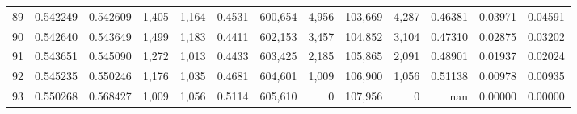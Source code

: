 \begin{tabular}{rrrrrrrrrrrrr}
89 &  0.542249 &  0.542609 &   1,405 &  1,164 &                                     0.4531 &  600,654 &    4,956 &  103,669 &    4,287 &  0.46381 &  0.03971 &  0.04591 \\
90 &  0.542640 &  0.543649 &   1,499 &  1,183 &                                     0.4411 &  602,153 &    3,457 &  104,852 &    3,104 &  0.47310 &  0.02875 &  0.03202 \\
91 &  0.543651 &  0.545090 &   1,272 &  1,013 &                                     0.4433 &  603,425 &    2,185 &  105,865 &    2,091 &  0.48901 &  0.01937 &  0.02024 \\
92 &  0.545235 &  0.550246 &   1,176 &  1,035 &                                     0.4681 &  604,601 &    1,009 &  106,900 &    1,056 &  0.51138 &  0.00978 &  0.00935 \\
93 &  0.550268 &  0.568427 &   1,009 &  1,056 &                                     0.5114 &  605,610 &        0 &  107,956 &        0 &      nan &  0.00000 &  0.00000 \\
\bottomrule
\end{tabular}
